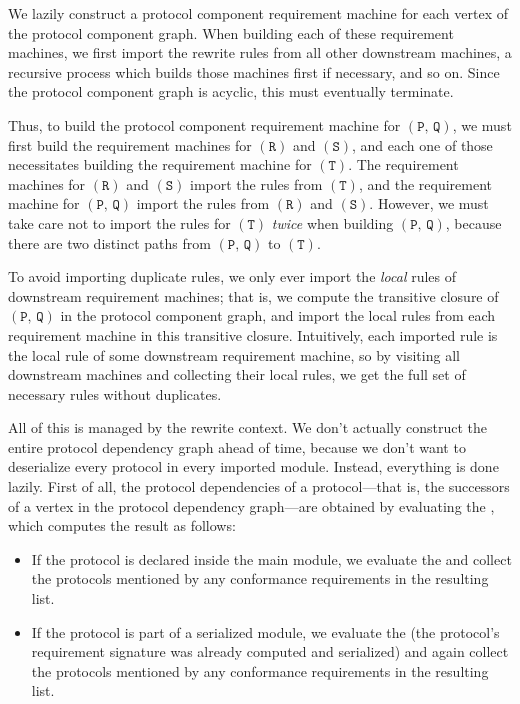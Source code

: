 \documentclass[../generics]{subfiles}
\begin{document}
We lazily construct a protocol component requirement machine for each vertex of the protocol component graph. When building each of these requirement machines, we first import the rewrite rules from all other downstream machines, a recursive process which builds those machines first if necessary, and so on. Since the protocol component graph is acyclic, this must eventually terminate.

Thus, to build the protocol component requirement machine for $(\texttt{P},\, \texttt{Q})$, we must first build the requirement machines for $(\texttt{R})$ and $(\texttt{S})$, and each one of those necessitates building the requirement machine for $(\texttt{T})$. The requirement machines for $(\texttt{R})$ and $(\texttt{S})$ import the rules from $(\texttt{T})$, and the requirement machine for $(\texttt{P},\, \texttt{Q})$ import the rules from $(\texttt{R})$ and $(\texttt{S})$. However, we must take care not to import the rules for $(\texttt{T})$ \emph{twice} when building $(\texttt{P},\, \texttt{Q})$, because there are two distinct paths from $(\texttt{P},\, \texttt{Q})$ to $(\texttt{T})$.

%
To avoid importing duplicate rules, we only ever import the \emph{local} rules of downstream requirement machines; that is, we compute the transitive closure of $(\texttt{P},\, \texttt{Q})$ in the protocol component graph, and import the local rules from each requirement machine in this transitive closure. Intuitively, each imported rule is the local rule of some downstream requirement machine, so by visiting all downstream machines and collecting their local rules, we get the full set of necessary rules without duplicates.

%
%
%
%
%
All of this is managed by the rewrite context. We don't actually construct the entire protocol dependency graph ahead of time, because we don't want to deserialize every protocol in every imported module. Instead, everything is done lazily. First of all, the protocol dependencies of a protocol---that is, the successors of a vertex in the protocol dependency graph---are obtained by evaluating the , which computes the result as follows:
\begin{itemize}
\item If the protocol is declared inside the main module, we evaluate the  and collect the protocols mentioned by any conformance requirements in the resulting list.

\item If the protocol is part of a serialized module, we evaluate the  (the protocol's requirement signature was already computed and serialized) and again collect the protocols mentioned by any conformance requirements in the resulting list.
\end{itemize}
\end{document}
